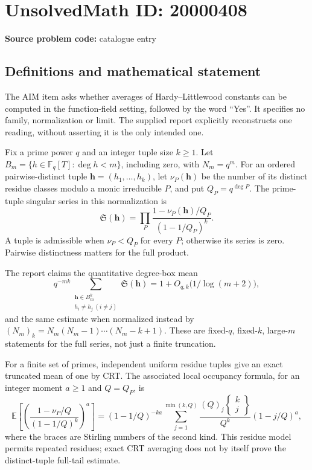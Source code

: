 \documentclass[11pt]{article}
\newcommand{\F}{\mathbb{F}}
\newcommand{\E}{\mathbb{E}}
\begin{document}
\section*{UnsolvedMath ID: 20000408}
\textbf{Source problem code:} catalogue entry
\subsection{Definitions and mathematical statement}
The AIM item asks whether averages of Hardy--Littlewood constants can be computed in the function-field setting, followed by the word ``Yes''. It specifies no family, normalization or limit. The supplied report explicitly reconstructs one reading, without asserting it is the only intended one.

Fix a prime power $q$ and an integer tuple size $k\geq1$. Let $B_m=\{h\in\F_q[T]:\deg h<m\}$, including zero, with $N_m=q^m$. For an ordered pairwise-distinct tuple $\mathbf h=(h_1,\ldots,h_k)$, let $\nu_P(\mathbf h)$ be the number of its distinct residue classes modulo a monic irreducible $P$, and put $Q_P=q^{\deg P}$. The prime-tuple singular series in this normalization is
\[
 \mathfrak S(\mathbf h)=\prod_P\frac{1-\nu_P(\mathbf h)/Q_P}{(1-1/Q_P)^k}.
\]
A tuple is admissible when $\nu_P<Q_P$ for every $P$; otherwise its series is zero. Pairwise distinctness matters for the full product.

The report claims the quantitative degree-box mean
\[
 q^{-mk}\sum_{\substack{\mathbf h\in B_m^k\\h_i\ne h_j\ (i\ne j)}}\mathfrak S(\mathbf h)
 =1+O_{q,k}\bigl(1/\log(m+2)\bigr),
\]
and the same estimate when normalized instead by $(N_m)_k=N_m(N_m-1)\cdots(N_m-k+1)$. These are fixed-$q$, fixed-$k$, large-$m$ statements for the full series, not just a finite truncation.

For a finite set of primes, independent uniform residue tuples give an exact truncated mean of one by CRT. The associated local occupancy formula, for an integer moment $a\geq1$ and $Q=Q_P$, is
\[
 \E\left[\left(\frac{1-\nu_P/Q}{(1-1/Q)^k}\right)^a\right]
 =(1-1/Q)^{-ka}\sum_{j=1}^{\min(k,Q)}
 \frac{(Q)_j\left\{\begin{smallmatrix}k\\j\end{smallmatrix}\right\}}{Q^k}(1-j/Q)^a,
\]
where the braces are Stirling numbers of the second kind. This residue model permits repeated residues; exact CRT averaging does not by itself prove the distinct-tuple full-tail estimate.
\end{document}
